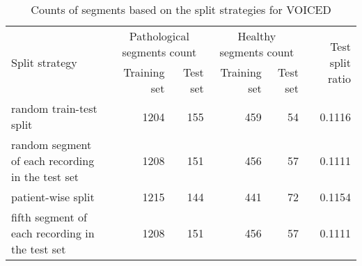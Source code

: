 \begin{table}
    \centering
    \tiny
    \begin{tabular}{lrrrrr}
        \toprule
        \multirow{2}{*}{Split strategy} & \multicolumn{2}{c}{Pathological segments count} & \multicolumn{2}{c}{Healthy segments count} & \multirow{2}{*}{Test split ratio} \\
        & Training set & Test set & Training set & Test set & \\
        \midrule
            random train-test split & 1204 & 155 & 459 & 54 & 0.1116 \\
			random segment of each recording in the test set & 1208 & 151 & 456 & 57 & 0.1111 \\
			patient-wise split & 1215 & 144 & 441 & 72 & 0.1154 \\
			fifth segment of each recording in the test set & 1208 & 151 & 456 & 57 & 0.1111 \\
        \bottomrule
    \end{tabular}
    \caption{Counts of segments based on the split strategies for VOICED}
    \label{tab:voiced_counts}
\end{table}